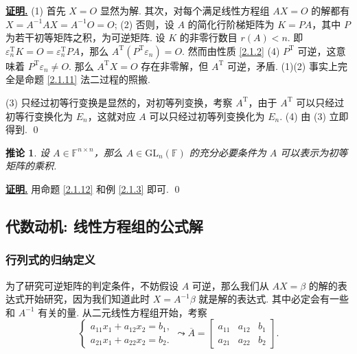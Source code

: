 \documentclass[10pt,openany]{article}
\theoremstyle{thmstyle} %
\theoremstyle{defstyle} %
\newtheorem{corollary}[theorem]{推论}
\theoremstyle{prostyle} %
\theoremstyle{exastyle}
\theoremstyle{remstyle}
\renewenvironment{proof}[1][证明]{\par\underline{\textbf{#1.}} \;\fangsong}{\qed\par}
\newcommand{\T}{^{\text{T}}}
\newcommand{\F}{\mathbb{F}}
\newcommand{\gfn}{\text{GL}_n(\mathbb{F})}
\newcommand{\n}{^{n \times n}}
\begin{document}
\begin{proof}
	(1) 首先 \( X=O \) 显然为解. 其次，对每个满足线性方程组 \( AX=O \) 的解都有 \( X=A^{-1}AX=A^{-1}O=O \);
	(2) 否则，设 \( A \) 的简化行阶梯矩阵为 \( K=PA \)，其中 \( P \) 为若干初等矩阵之积，为可逆矩阵. 设 \( K \) 的非零行数目 \( r(A)<n \). 即 \( \varepsilon_n\T K=O= \varepsilon_n\T PA \)，那么 \( A\T(P\T \varepsilon_n)=O \). 然而由性质 \ref{2.1.2} (4) \( P\T \) 可逆，这意味着 \( P\T \varepsilon_n \neq O \). 那么 \( A\T X=O \) 存在非零解，但 \( A\T \) 可逆，矛盾. (1)(2) 事实上完全是命题 \ref{2.1.11} 法二过程的照搬.
	
	\vspace{1ex}
	
    (3) 只经过初等行变换是显然的，对初等列变换，考察 \( A\T \)，由于 \( A\T \) 可以只经过初等行变换化为 \( E_n \)，这就对应 \( A \) 可以只经过初等列变换化为 \( E_n \). (4) 由 (3) 立即得到.
\end{proof}

\begin{corollary}	\label{2.1.13}
	设 \( A \in \F\n \)，那么 \( A \in \gfn \) 的充分必要条件为 \( A \) 可以表示为初等矩阵的乘积.

\end{corollary}

\begin{proof}
	用命题 \ref{2.1.12} 和例 \ref{2.1.3} 即可.
\end{proof}

\subsection{代数动机: 线性方程组的公式解}

\subsubsection{行列式的归纳定义}
为了研究可逆矩阵的判定条件，不妨假设 \( A \) 可逆，那么我们从 \( AX=\beta \) 的解的表达式开始研究，因为我们知道此时 \( X=A^{-1}\beta \) 就是解的表达式. 其中必定会有一些和 \( A^{-1} \) 有关的量. 从二元线性方程组开始，考察
\[ \left\{ \begin{array}{l}
	a_{11}x_1+a_{12}x_2=b_1, \\
	a_{21}x_1+a_{22}x_2=b_2.
\end{array}\right. \leadsto \overline{A}=\begin{bmatrix}
 a_{11} & a_{12} & b_1 \\
 a_{21} & a_{22} & b_2
\end{bmatrix}. \]
\end{document}
